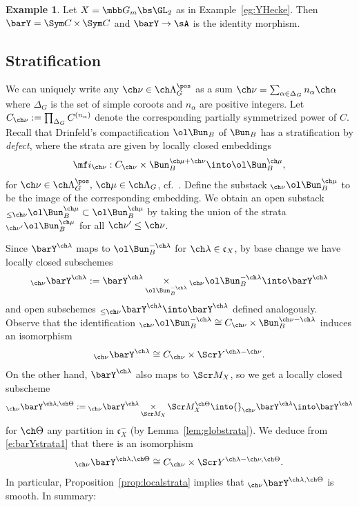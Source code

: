 \documentclass[final]{amsart}
\theoremstyle{remark}
\theoremstyle{definition}
\newtheorem{eg}[subsubsection]{Example}
\DeclareMathOperator*{\xt}{\times}
\numberwithin{equation}{section}
\begin{document}
\begin{eg} \label{eg:Heckecompact}
Let $X = \mbb G_m \bs \GL_2$ as in Example~\ref{eg:YHecke}. 
Then $\barY = \Sym C \xt \Sym C$ and $\barY \to \sA$ is the identity morphism. 
\end{eg}

\subsection{Stratification} 
\label{sect:strat-compactified}
We can uniquely write any $\ch\nu \in \ch\Lambda^\pos_G$ 
as a sum $\ch\nu = \sum_{\alpha\in \Delta_G} n_\alpha \ch\alpha$ where $\Delta_G$ is the set of 
simple coroots and $n_\alpha$ are positive integers. 
Let $C_{\ch\nu} := \prod_{\Delta_G} C^{(n_\alpha)}$ denote the corresponding partially
symmetrized power of $C$. 
Recall that Drinfeld's 
compactification $\ol\Bun_B$ of $\Bun_B$ has a 
stratification by \emph{defect}, where the strata are given by 
locally closed embeddings
\[ \mf i_{\ch\nu}: C_{\ch\nu} \times \Bun^{\ch\mu+\ch\nu}_B \into \ol\Bun^{\ch\mu}_B, \]
for $\ch\nu\in \ch\Lambda^\pos_G,\, \ch\mu \in \ch\Lambda_G$, cf.~\cite[\S 1.5, p.~7]{BFGM}. 
Define the substack ${_{\ch\nu}}\ol\Bun_B^{\ch\mu}$ to be the image 
of the corresponding embedding. 
We obtain an open substack $_{\le \ch\nu}\ol\Bun_B^{\ch\mu} \subset \ol\Bun^{\ch\mu}_B$ by taking the union of the strata $_{\ch\nu'}\ol\Bun_B^{\ch\mu}$ 
for all $\ch\nu' \le \ch\nu$. 

Since $\barY^{\ch\lambda}$ maps to $\ol\Bun_B^{-\ch\lambda}$ for $\ch\lambda \in \mathfrak c_X$, by base change we have locally
closed subschemes 
\[ {}_{\ch\nu} \barY^{\ch\lambda} := \barY^{\ch\lambda} \xt_{\ol\Bun_B^{-\ch\lambda}} {}_{\ch\nu} \ol\Bun_B^{-\ch\lambda} \into \barY^{\ch\lambda} \]
and open subschemes ${}_{\le \ch\nu} \barY^{\ch\lambda} \into \barY^{\ch\lambda}$ defined analogously.
Observe that the identification ${}_{\ch\nu} \ol\Bun_B^{-\ch\lambda} \cong 
C_{\ch\nu} \times \Bun_B^{\ch\nu-\ch\lambda}$ induces an isomorphism
\begin{equation} \label{e:barYstrata1}
    {}_{\ch\nu} \barY^{\ch\lambda}  \cong C_{\ch\nu} \times \Scr Y^{\ch\lambda-\ch\nu}. 
\end{equation}
On the other hand, $\barY^{\ch\lambda}$ also maps to $\Scr M_X$, so 
we get a locally closed subscheme 
\[ {}_{\ch\nu}\barY^{\ch\lambda,\ch\Theta} := {}_{\ch\nu}\barY^{\ch\lambda} \xt_{\Scr M_X} \Scr M_X^{\ch\Theta} \into {}_{\ch\nu}\barY^{\ch\lambda} \into \barY^{\ch\lambda} \] 
for $\ch\Theta$ any partition in $\mathfrak c_X^-$ 
(by Lemma~\ref{lem:globstrata}). 
We deduce from \eqref{e:barYstrata1} that there is an isomorphism
\[ {}_{\ch\nu} \barY^{\ch\lambda,\ch\Theta} \cong C_{\ch\nu} \times \Scr Y^{\ch\lambda-\ch\nu, \ch\Theta}. \] 
In particular, Proposition~\ref{prop:localstrata} implies that 
${}_{\ch\nu} \barY^{\ch\lambda,\ch\Theta}$ is smooth. 
In summary: 
\end{document}
